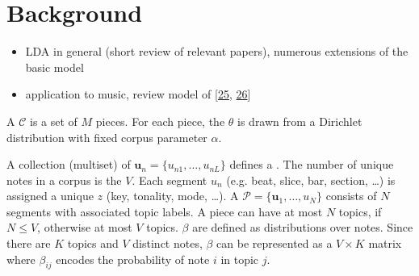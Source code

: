 \documentclass[letterpaper,10pt,english]{sphinxmanual}
\begin{document}
\section{Background}
\label{\detokenize{topic_modeling:background}}\begin{itemize}
\item {} 
\sphinxAtStartPar
LDA in general (short review of relevant papers), numerous
extensions of the basic model

\item {} 
\sphinxAtStartPar
application to music, review model of
{[}\hyperlink{cite.8_bibliography:id65}{25}, \hyperlink{cite.8_bibliography:id66}{26}{]}

\end{itemize}

\sphinxAtStartPar
A  \(\mathcal C\) is a set of \(M\) pieces. For each
piece, the  \(\theta\) is drawn from a
Dirichlet distribution with fixed corpus parameter \(\alpha.\)

\sphinxAtStartPar
A collection (multiset) of 
\(\boldsymbol{u}_n = \{u_{n1},\ldots,u_{nL}\}\) defines a
. The number of unique notes in a corpus is the  \(V\). Each segment \({u}_n\) (e.g. beat, slice, bar,
section, …) is assigned a unique  \(z\) (key,
tonality, mode, …). A 
\(\mathcal P = \{\boldsymbol{u}_1, \ldots, u_N\}\) consists of
\(N\) segments with associated topic labels. A piece can have at
most \(N\) topics, if \(N\leq V\), otherwise at most \(V\)
topics.  \(\beta\) are defined as distributions over
notes.
Since there are \(K\) topics and \(V\) distinct notes,
\(\beta\) can be represented as a \(V \times K\) matrix where
\(\beta_{ij}\) encodes the probability of note \(i\) in topic
\(j\).
\end{document}
